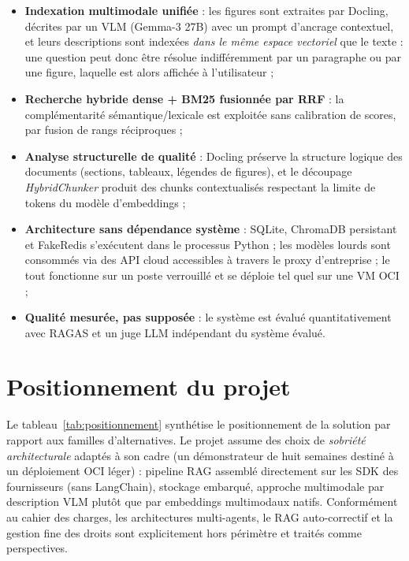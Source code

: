 \begin{keybox}
\begin{itemize}
  \item \textbf{Indexation multimodale unifiée} : les figures sont extraites par Docling,
        décrites par un VLM (Gemma-3 27B) avec un prompt d'ancrage contextuel, et leurs
        descriptions sont indexées \emph{dans le même espace vectoriel} que le texte : une
        question peut donc être résolue indifféremment par un paragraphe ou par une figure,
        laquelle est alors affichée à l'utilisateur ;
  \item \textbf{Recherche hybride dense + BM25 fusionnée par RRF} : la complémentarité
        sémantique/lexicale est exploitée sans calibration de scores, par fusion de rangs
        réciproques \cite{cormack2009rrf} ;
  \item \textbf{Analyse structurelle de qualité} : Docling préserve la structure logique
        des documents (sections, tableaux, légendes de figures), et le découpage
        \emph{HybridChunker} produit des chunks contextualisés respectant la limite de
        tokens du modèle d'embeddings ;
  \item \textbf{Architecture sans dépendance système} : SQLite, ChromaDB persistant et
        FakeRedis s'exécutent dans le processus Python ; les modèles lourds sont consommés
        via des API cloud accessibles à travers le proxy d'entreprise ; le tout
        fonctionne sur un poste verrouillé et se déploie tel quel sur une VM OCI ;
  \item \textbf{Qualité mesurée, pas supposée} : le système est évalué quantitativement
        avec RAGAS \cite{es2023ragas} et un juge LLM indépendant du système évalué.
\end{itemize}
\end{keybox}

\section{Positionnement du projet}
\label{sec:positionnement}

Le tableau~\ref{tab:positionnement} synthétise le positionnement de la solution par rapport
aux familles d'alternatives. Le projet assume des choix de \emph{sobriété architecturale}
adaptés à son cadre (un démonstrateur de huit semaines destiné à un déploiement OCI léger) :
pipeline RAG assemblé directement sur les SDK des fournisseurs (sans LangChain), stockage
embarqué, approche multimodale par description VLM plutôt que par embeddings multimodaux
natifs. Conformément au cahier des charges, les architectures multi-agents, le RAG
auto-correctif et la gestion fine des droits sont explicitement hors périmètre et traités
comme perspectives.

